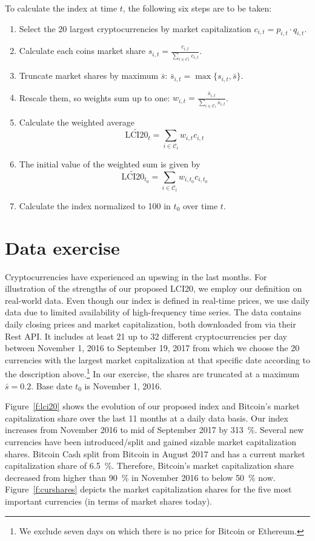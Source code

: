 \documentclass[11pt]{article}
\begin{document}
\noindent To calculate the index at time $t$, the following six steps are to be taken:
\begin{enumerate}
  \item Select the 20 largest cryptocurrencies by market capitalization $c_{i,t} = p_{i,t} \cdot q_{i,t}$.
  \item Calculate each coins market share $s_{i,t} = \frac{c_{i,t}}{\sum_{i \in C_t} c_{i,t}}$.
  \item Truncate market shares by maximum $\bar s$: $\bar s_{i,t} = \max\{ s_{i,t}, \bar s\}$.
  \item Rescale them, so weights sum up to one: $w_{i,t} = \frac{\bar s_{i,t}}{\sum_{i \in \mathcal{C}_t} \bar s_{i,t}}$.
  \item Calculate the weighted average $$\widetilde{\text{LCI20}}_t = \sum_{i \in \mathcal{C}_{t}} w_{i,t} c_{i,t}$$
  \item The initial value of the weighted sum is given by $$\widetilde{\text{LCI20}}_{t_0} = \sum_{i \in \mathcal{C}_{t}} w_{i,t_0} c_{i,t_0}$$
  \item Calculate the index normalized to 100 in $t_0$ over time $t$. %
\end{enumerate}


\section{Data exercise}

Cryptocurrencies have experienced an upswing in the last months.
For illustration of the strengths of our proposed LCI20, we employ our definition on real-world data.
Even though our index is defined in real-time prices, we use daily data due to limited availability of high-frequency time series.
The data contains daily closing prices and market capitalization, both downloaded from \cite{CoinCap} via their Rest API.
It includes at least 21 up to 32 different cryptocurrencies per day between November 1, 2016 to September 19, 2017 from which we choose the 20 currencies with the largest market capitalization at that specific date according to the description above.\footnote{We exclude seven days on which there is no price for Bitcoin or Ethereum.}
In our exercise, the shares are truncated at a maximum $\bar s = 0.2$.
Base date $t_0$ is November 1, 2016.

Figure~\ref{f:lci20} shows the evolution of our proposed index and Bitcoin's market capitalization share over the last 11 months at a daily data basis.
Our index increases from November 2016 to mid of September 2017 by 313~\%.
Several new currencies have been introduced/split and gained sizable market capitalization shares.
Bitcoin Cash split from Bitcoin in August 2017 and has a current market capitalization share of 6.5~\%.
Therefore, Bitcoin's market capitalization share decreased from higher than 90~\% in November 2016 to below 50~\% now.
Figure~\ref{f:curshares} depicts the market capitalization shares for the five most important currencies (in terms of market shares today).
\end{document}
